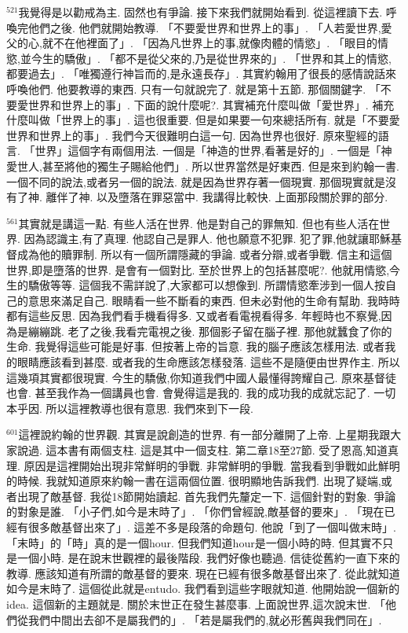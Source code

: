 \documentclass{book}
\begin{document}
$^{521}$我覺得是以勸戒為主.
固然也有爭論.
接下來我們就開始看到.
從這裡讀下去.
呼喚完他們之後.
他們就開始教導.
「不要愛世界和世界上的事」.
「人若愛世界,愛父的心,就不在他裡面了」.
「因為凡世界上的事,就像肉體的情慾」.
「眼目的情慾,並今生的驕傲」.
「都不是從父來的,乃是從世界來的」.
「世界和其上的情慾,都要過去」.
「唯獨遵行神旨而的,是永遠長存」.
其實約翰用了很長的感情說話來呼喚他們.
他要教導的東西.
只有一句就說完了.
就是第十五節.
那個關鍵字.
「不要愛世界和世界上的事」.
下面的說什麼呢?.
其實補充什麼叫做「愛世界」.
補充什麼叫做「世界上的事」.
這也很重要.
但是如果要一句來總括所有.
就是「不要愛世界和世界上的事」.
我們今天很難明白這一句.
因為世界也很好.
原來聖經的語言.
「世界」這個字有兩個用法.
一個是「神造的世界,看著是好的」.
一個是「神愛世人,甚至將他的獨生子賜給他們」.
所以世界當然是好東西.
但是來到約翰一書.
一個不同的說法,或者另一個的說法.
就是因為世界存著一個現實.
那個現實就是沒有了神.
離伴了神.
以及墮落在罪惡當中.
我講得比較快.
上面那段關於罪的部分.

$^{561}$其實就是講這一點.
有些人活在世界.
他是對自己的罪無知.
但也有些人活在世界.
因為認識主,有了真理.
他認自己是罪人.
他也願意不犯罪.
犯了罪,他就讓耶穌基督成為他的贖罪制.
所以有一個所謂隱藏的爭論.
或者分辯,或者爭戰.
信主和這個世界,即是墮落的世界.
是會有一個對比.
至於世界上的包括甚麼呢?.
他就用情慾,今生的驕傲等等.
這個我不需詳說了,大家都可以想像到.
所謂情慾牽涉到一個人按自己的意思來滿足自己.
眼睛看一些不斷看的東西.
但未必對他的生命有幫助.
我時時都有這些反思.
因為我們看手機看得多.
又或者看電視看得多.
年輕時也不察覺,因為是繃繃跳.
老了之後,我看完電視之後.
那個影子留在腦子裡.
那他就蠶食了你的生命.
我覺得這些可能是好事.
但按著上帝的旨意.
我的腦子應該怎樣用法.
或者我的眼睛應該看到甚麼.
或者我的生命應該怎樣發落.
這些不是隨便由世界作主.
所以這幾項其實都很現實.
今生的驕傲,你知道我們中國人最懂得誇耀自己.
原來基督徒也會.
甚至我作為一個講員也會.
會覺得這是我的.
我的成功我的成就忘記了.
一切本乎因.
所以這裡教導也很有意思.
我們來到下一段.

$^{601}$這裡說約翰的世界觀.
其實是說創造的世界.
有一部分離開了上帝.
上星期我跟大家說過.
這本書有兩個支柱.
這是其中一個支柱.
第二章18至27節.
受了恩高,知道真理.
原因是這裡開始出現非常鮮明的爭戰.
非常鮮明的爭戰.
當我看到爭戰如此鮮明的時候.
我就知道原來約翰一書在這兩個位置.
很明顯地告訴我們.
出現了疑端,或者出現了敵基督.
我從18節開始讀起.
首先我們先釐定一下.
這個針對的對象.
爭論的對象是誰.
「小子們,如今是末時了」.
「你們曾經說,敵基督的要來」.
「現在已經有很多敵基督出來了」.
這差不多是段落的命題句.
他說「到了一個叫做末時」.
「末時」的「時」真的是一個hour.
但我們知道hour是一個小時的時.
但其實不只是一個小時.
是在說末世觀裡的最後階段.
我們好像也聽過.
信徒從舊約一直下來的教導.
應該知道有所謂的敵基督的要來.
現在已經有很多敵基督出來了.
從此就知道如今是末時了.
這個從此就是entudo.
我們看到這些字眼就知道.
他開始說一個新的idea.
這個新的主題就是.
關於末世正在發生甚麼事.
上面說世界,這次說末世.
「他們從我們中間出去卻不是屬我們的」.
「若是屬我們的,就必形舊與我們同在」.
\end{document}
